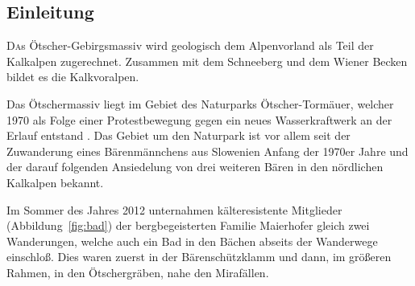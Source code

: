 \documentclass[twoside]{article}
\begin{document}
\begin{multicols}{2} %

\section{Einleitung}

\lettrine[nindent=0em,lines=3]{D} as Ötscher-Gebirgsmassiv wird geologisch dem Alpenvorland als Teil der
Kalkalpen zugerechnet. Zusammen mit dem Schneeberg und dem Wiener Becken bildet es die Kalkvoralpen. \cite{SH:2012}

Das Ötschermassiv liegt im Gebiet des Naturparks Ötscher-Tormäuer, welcher 1970 als Folge einer Protestbewegung gegen ein neues Wasserkraftwerk an der Erlauf
entstand \cite{NOT:2013:Online}. Das Gebiet um den Naturpark ist vor allem seit der Zuwanderung eines Bärenmännchens aus Slowenien Anfang der 1970er Jahre und
der darauf folgenden Ansiedelung von drei weiteren Bären in den nördlichen Kalkalpen bekannt.

Im Sommer des Jahres 2012 unternahmen kälteresistente Mitglieder (Abbildung~\ref{fig:bad}) der
bergbegeisterten Familie Maierhofer gleich zwei Wanderungen, welche auch ein Bad in den
Bächen abseits der Wanderwege einschloß. Dies waren zuerst in der Bärenschützklamm und dann, im größeren Rahmen, in den Ötschergräben, nahe den Mirafällen.



\end{multicols}
\end{document}
